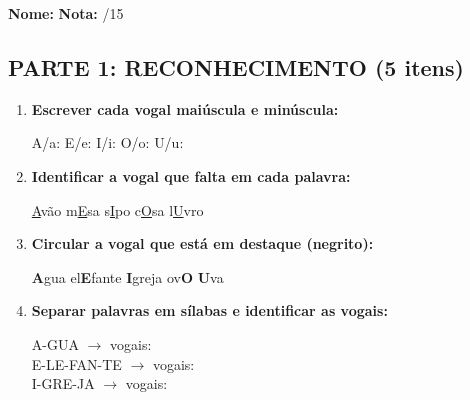 \begin{exercicio}

\noindent\textbf{Nome:} \underline{\hspace{4cm}} \quad \textbf{Nota:} \underline{\hspace{1cm}}/15

\subsection*{PARTE 1: RECONHECIMENTO (5 itens)}

\begin{enumerate}
  \item \textbf{Escrever cada vogal maiúscula e minúscula:}
  \begin{center}
  A/a: \underline{\hspace{1.5cm}} \quad E/e: \underline{\hspace{1.5cm}} \quad I/i: \underline{\hspace{1.5cm}} \quad O/o: \underline{\hspace{1.5cm}} \quad U/u: \underline{\hspace{1.5cm}}
  \end{center}

  \item \textbf{Identificar a vogal que falta em cada palavra:}
  \begin{center}
  \underline{A}vão \quad m\underline{E}sa \quad s\underline{I}po \quad c\underline{O}sa \quad l\underline{U}vro
  \end{center}

  \item \textbf{Circular a vogal que está em destaque (negrito):}
  \begin{center}
  \textbf{A}gua \quad el\textbf{E}fante \quad \textbf{I}greja \quad ov\textbf{O} \quad \textbf{U}va
  \end{center}

  \item \textbf{Separar palavras em sílabas e identificar as vogais:}
  \begin{center}
  A-GUA $\rightarrow$ vogais: \underline{\hspace{2cm}} \\
  E-LE-FAN-TE $\rightarrow$ vogais: \underline{\hspace{2cm}} \\
  I-GRE-JA $\rightarrow$ vogais: \underline{\hspace{2cm}}
  \end{center}


\end{enumerate}
\end{exercicio}
